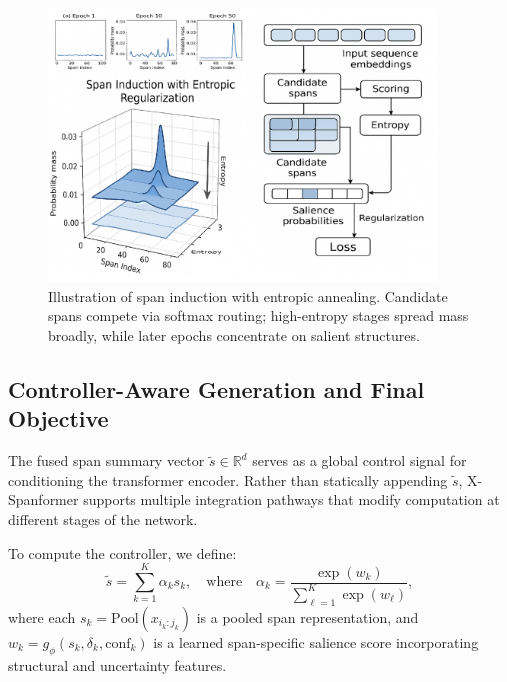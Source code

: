 \vspace{1.5em}
\begin{figure}[H]
  \centering
  \includegraphics[width=0.92\textwidth]{figures/figure_4.png}
  \caption{Illustration of span induction with entropic annealing. Candidate spans compete via softmax routing; high-entropy stages spread mass broadly, while later epochs concentrate on salient structures.}
  \label{fig:span_entropy_illustration}
\end{figure}

\subsection{Controller-Aware Generation and Final Objective}
\label{sec:controller-injection}

The fused span summary vector \(\tilde{s} \in \mathbb{R}^d\) serves as a global control signal for conditioning the transformer encoder. Rather than statically appending \(\tilde{s}\), X-Spanformer supports multiple integration pathways that modify computation at different stages of the network.

To compute the controller, we define:
\[
\tilde{s} = \sum_{k=1}^K \alpha_k s_k, \quad \text{where} \quad \alpha_k = \frac{\exp(w_k)}{\sum_{\ell=1}^K \exp(w_\ell)},
\]
where each \(s_k = \mathrm{Pool}(x_{i_k:j_k})\) is a pooled span representation, and \(w_k = g_\phi(s_k, \delta_k, \mathrm{conf}_k)\) is a learned span-specific salience score incorporating structural and uncertainty features.

